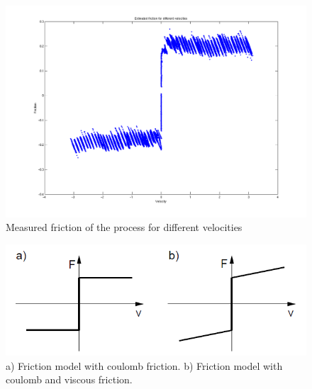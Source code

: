 \documentclass[10pt,a4paper]{article}
\begin{document}
\begin{figure}[!htb]
\begin{center}
\includegraphics[width=1\textwidth]{fric.png}
\caption{Measured friction of the process for different velocities}
\label{fig:fric}
\end{center}
\end{figure}
\begin{figure}[!htb]
\begin{center}
\includegraphics[width=1\textwidth]{frictmodel.png}
\caption{a) Friction model with coulomb friction. b) Friction model with coulomb and viscous friction.}
\label{fig:frictmodel}
\end{center}
\end{figure}
\end{document}
